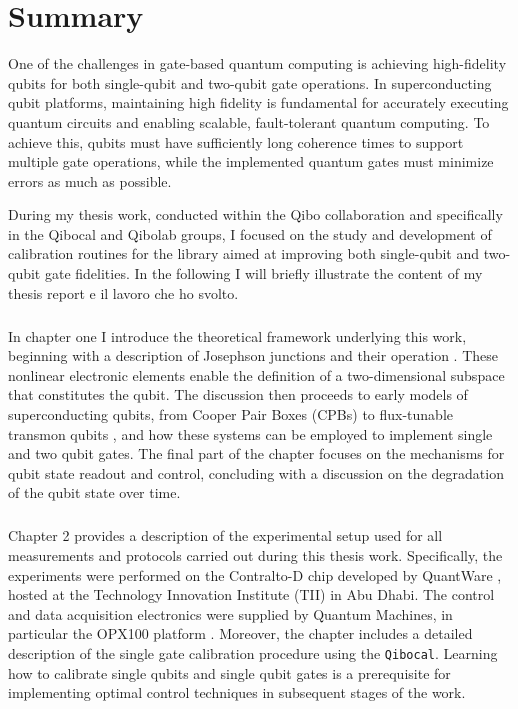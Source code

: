 \chapter*{Summary}
One of the challenges in gate-based quantum computing is achieving high-fidelity qubits for both single-qubit and two-qubit gate operations.
In superconducting qubit platforms, maintaining high fidelity is fundamental for accurately executing quantum circuits and enabling scalable, fault-tolerant quantum computing. 
To achieve this, qubits must have sufficiently long coherence times to support multiple gate operations, while the implemented quantum gates must minimize errors as much as possible.

During my thesis work, conducted within the Qibo collaboration and specifically in the Qibocal and Qibolab groups, I focused on the study and development of calibration routines for the \Qibocal library aimed at improving both single-qubit and two-qubit gate fidelities.
In the following I will briefly illustrate the content of my thesis report e il lavoro che ho svolto.

\paragraph{}
In chapter one I introduce the theoretical framework underlying this work, beginning with a description of Josephson junctions and their operation \cite{JOSEPHSON1962251}. 
These nonlinear electronic elements enable the definition of a two-dimensional subspace that constitutes the qubit. 
The discussion then proceeds to early models of superconducting qubits, from Cooper Pair Boxes (CPBs) \cite{Vion2002} to flux-tunable transmon qubits \cite{TransmonPaper}, and how these systems can be employed to implement single and two qubit gates. 
The final part of the chapter focuses on the mechanisms for qubit state readout and control, concluding with a discussion on the degradation of the qubit state over time.

\paragraph{}
Chapter 2 provides a description of the experimental setup used for all measurements and protocols carried out during this thesis work. 
Specifically, the experiments were performed on the Contralto-D chip developed by QuantWare \cite{qw11q}, hosted at the Technology Innovation Institute (TII) in Abu Dhabi. 
The control and data acquisition electronics were supplied by Quantum Machines, in particular the OPX100 platform \cite{opx1000}.
Moreover, the chapter includes a detailed description of the single gate calibration procedure using the \texttt{Qibocal}. 
Learning how to calibrate single qubits and single qubit gates is a prerequisite for implementing optimal control techniques in subsequent stages of the work.

